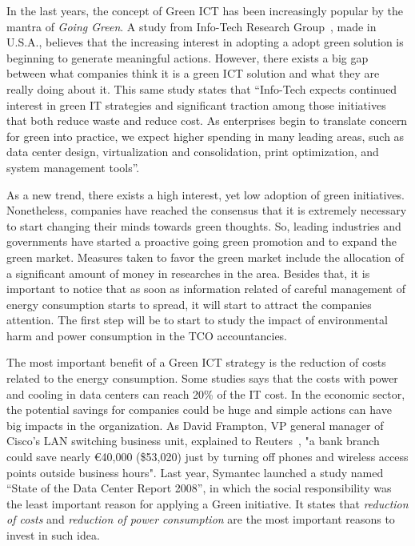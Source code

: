     In the last years, the concept of Green ICT has been increasingly popular by the mantra of \emph{Going Green}. A study from Info-Tech Research Group~\cite{info-tech07}, made in U.S.A., believes that the increasing interest in adopting a adopt green solution is beginning to generate meaningful actions. However, there exists a big gap between what companies think it is a green ICT solution and what they are really doing about it. This same study states that ``Info-Tech expects continued interest in green IT strategies and significant traction among those initiatives that both reduce waste and reduce cost. As enterprises begin to translate concern for green into practice, we expect higher spending in many leading areas, such as data center design, virtualization and consolidation, print optimization, and system management tools''.
    
    As a new trend, there exists a high interest, yet low adoption of green initiatives. Nonetheless, companies have reached the consensus that it is extremely necessary to start changing their minds towards green thoughts. So, leading industries and governments have started a proactive going green promotion and to expand the green market. Measures taken to favor the green market include the allocation of a significant amount of money in researches in the area. Besides that, it is important to notice that as soon as information related of careful management of energy consumption starts to spread, it will start to attract the companies attention. The first step will be to start to study the impact of environmental harm and power consumption in the TCO accountancies.
    
    The most important benefit of a Green ICT strategy is the reduction of costs related to the energy consumption. Some studies says that the costs with power and cooling in data centers can reach 20\% of the IT cost. In the economic sector, the potential savings for companies could be huge and simple actions can have big impacts in the organization. As David Frampton, VP general manager of Cisco's LAN switching business unit, explained to Reuters~\cite{Chestney2009}, "a bank branch could save nearly \euro40,000 (\$53,020) just by turning off phones and wireless access points outside business hours". Last year, Symantec launched a study named ``State of the Data Center Report 2008'', in which the social responsibility was the least important reason for applying a Green initiative. It states that \emph{reduction of costs} and \emph{reduction of power consumption} are the most important reasons to invest in such idea. 
    
